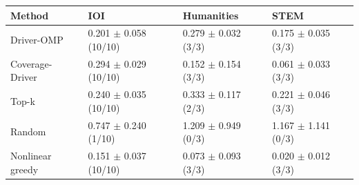 \begin{tabular}{llll}
\toprule
Method & IOI & Humanities & STEM \\
\midrule
Driver-OMP & 0.201 $\pm$ 0.058 (10/10) & 0.279 $\pm$ 0.032 (3/3) & 0.175 $\pm$ 0.035 (3/3) \\
Coverage-Driver & 0.294 $\pm$ 0.029 (10/10) & 0.152 $\pm$ 0.154 (3/3) & 0.061 $\pm$ 0.033 (3/3) \\
Top-k & 0.240 $\pm$ 0.035 (10/10) & 0.333 $\pm$ 0.117 (2/3) & 0.221 $\pm$ 0.046 (3/3) \\
Random & 0.747 $\pm$ 0.240 (1/10) & 1.209 $\pm$ 0.949 (0/3) & 1.167 $\pm$ 1.141 (0/3) \\
Nonlinear greedy & 0.151 $\pm$ 0.037 (10/10) & 0.073 $\pm$ 0.093 (3/3) & 0.020 $\pm$ 0.012 (3/3) \\
\bottomrule
\end{tabular}
